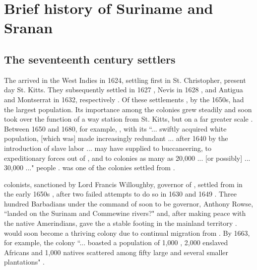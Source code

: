 
\section{Brief history of Suriname and Sranan} \label{1.2}
\subsection{The seventeenth century settlers} \label{1.2.1}

The  arrived in the West Indies in 1624, settling first in St. Christopher, present day St. Kitts. They subsequently settled  in 1627  \citep[18]{Dunn73}, Nevis in 1628  \citep[297]{Wroughton06}, and Antigua and Montserrat in 1632, respectively \citep[27]{Forsyth69}. Of these settlements , by the 1650s, had the largest population. Its importance among the  colonies grew steadily and  soon took over the function of a way station from St. Kitts, but on a far greater scale \citep{Davies74}. Between 1650 and 1680, for example, , with its ``... swiftly acquired white population, [which was] made increasingly redundant ... after 1640 by the introduction of slave labor ... may have supplied to buccaneering, to expeditionary forces out of , and to colonies as many as 20,000 ... [or possibly] ... 30,000 ..." people \citep[137]{Davies74}.  was one of the colonies settled from .

 colonists, sanctioned by Lord Francis Willoughby, governor of , settled  from  in the early 1650s \citep{Ehrlich09, Arbell02, Hyamson08}, after two failed attempts to do so in 1630 and 1649 \citep[82]{Arbell02}. Three hundred Barbadians under the command of soon to be governor, Anthony Rowse, ``landed on the Surinam and Commewine rivers?" and, after making peace with the native Amerindians, gave the  a stable footing in the mainland territory \citep[414]{Salomon99}.  would soon become a thriving colony due to continual migration from . By 1663, for example, the  colony ``... boasted a population of 1,000 , 2,000 enslaved Africans and 1,000 natives scattered among fifty large and several smaller plantations" \citep[808]{Marley05}.

